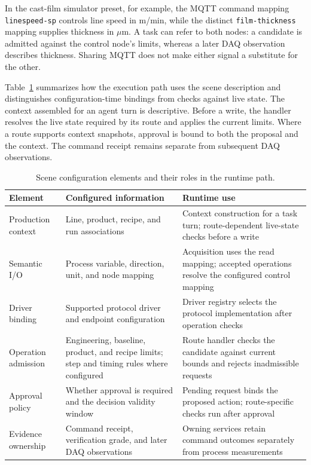 In the cast-film simulator preset, for example, the MQTT command mapping
\texttt{linespeed-sp} controls line speed in m/min, while the distinct
\texttt{film-thickness} mapping supplies thickness in $\mu$m. A task can
refer to both nodes: a candidate is admitted against the control node's
limits, whereas a later DAQ observation describes thickness. Sharing MQTT does
not make either signal a substitute for the other.

Table~\ref{tab:scene-config} summarizes how the execution path uses the scene
description and distinguishes configuration-time bindings from checks against
live state. The context assembled for an agent turn is descriptive. Before a
write, the handler resolves the live state required by its route and applies
the current limits. Where a route supports context snapshots, approval is
bound to both the proposal and the context. The command receipt remains
separate from subsequent DAQ observations.

\begin{table}[!t]
\centering
\caption{Scene configuration elements and their roles in the runtime path.}
\label{tab:scene-config}
\footnotesize
\setlength{\tabcolsep}{5pt}
\begin{tabularx}{\textwidth}{@{}>{\raggedright\arraybackslash}p{}>{\raggedright\arraybackslash}p{}X@{}}
\toprule
Element & Configured information & Runtime use\\
\midrule
Production context & Line, product, recipe, and run associations & Context construction for a task turn; route-dependent live-state checks before a write\\
Semantic I/O & Process variable, direction, unit, and node mapping & Acquisition uses the read mapping; accepted operations resolve the configured control mapping\\
Driver binding & Supported protocol driver and endpoint configuration & Driver registry selects the protocol implementation after operation checks\\
Operation admission & Engineering, baseline, product, and recipe limits; step and timing rules where configured & Route handler checks the candidate against current bounds and rejects inadmissible requests\\
Approval policy & Whether approval is required and the decision validity window & Pending request binds the proposed action; route-specific checks run after approval\\
Evidence ownership & Command receipt, verification grade, and later DAQ observations & Owning services retain command outcomes separately from process measurements\\
\bottomrule
\end{tabularx}
\end{table}

